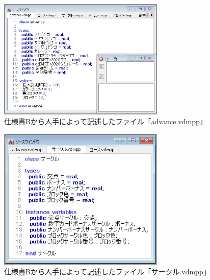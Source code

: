 \begin{figure}[tp]
    \begin{center}
    \includegraphics[width=300]{image/speB_vdm1.PNG}
    \caption{仕様書Bから人手によって記述したファイル「advance.vdmpp」}
    \label{fig:speB_vdm1}
    \end{center}
\end{figure}

\begin{figure}[tp]
    \begin{center}
    \includegraphics[width=300]{image/speB_vdm2.PNG}
    \caption{仕様書Bから人手によって記述したファイル「サークル.vdmpp」}
    \label{fig:speB_vdm2}
    \end{center}
\end{figure}

